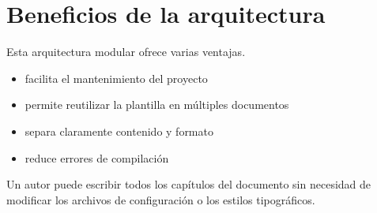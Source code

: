 \section{Beneficios de la arquitectura}

Esta arquitectura modular ofrece varias ventajas.

\begin{itemize}

\item facilita el mantenimiento del proyecto
\item permite reutilizar la plantilla en múltiples documentos
\item separa claramente contenido y formato
\item reduce errores de compilación

\end{itemize}



\begin{examplebox}
Un autor puede escribir todos los capítulos del documento
sin necesidad de modificar los archivos de configuración
o los estilos tipográficos.
\end{examplebox}
